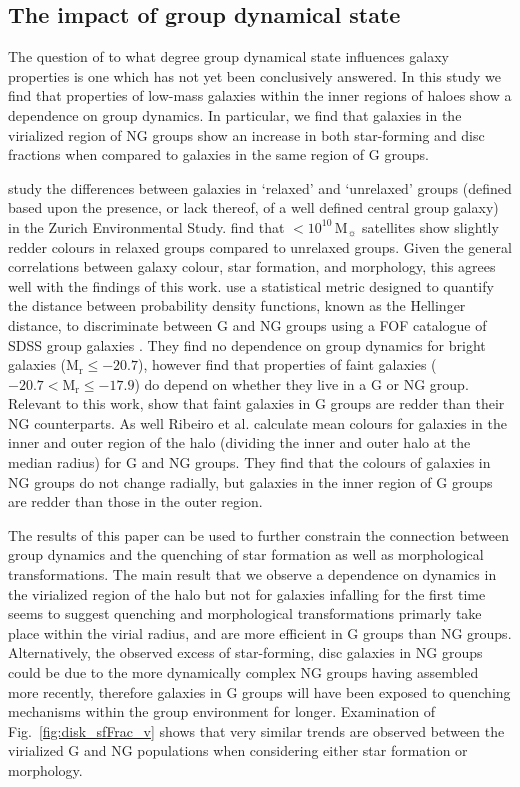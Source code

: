 \documentclass[a4paper,fleqn,usenatbib]{mnras}
\newcommand{\Msun}{\,\mathrm{M_{\sun}}}
\begin{document}
\subsection{The impact of group dynamical state}

The question of to what degree group dynamical state influences galaxy
properties is one which has not yet been conclusively answered.  In
this study we find that properties of low-mass galaxies within the inner
regions of haloes show a dependence on group dynamics.  In
particular, we find that galaxies in the virialized region of NG
groups show an increase in both star-forming and disc fractions
when compared to galaxies in the same region of G groups.
\par
\citet{carollo2013} study the differences between galaxies in
`relaxed' and `unrelaxed' groups (defined based upon the presence, or
lack thereof, of a well defined central group galaxy) in the Zurich
Environmental Study.  \citet{carollo2013} find that $<10^{10}\Msun$
satellites show slightly redder colours in relaxed groups compared to
unrelaxed groups.  Given the general correlations between galaxy colour, star
formation, and morphology, this agrees well with the findings of this
work. \citet{ribeiro2013} use a statistical metric designed to quantify the
distance between probability density functions, known as the Hellinger
distance, to discriminate between G and NG groups using a
FOF catalogue of SDSS group galaxies
\citep{berlind2006}.  They find no dependence on group dynamics for
bright galaxies ($\mathrm{M_r} \le -20.7$), however find that
properties of faint galaxies ($-20.7 < \mathrm{M_r} \le -17.9$) do
depend on whether they live in a G or NG group.  Relevant to this
work, \citet{ribeiro2013} show that faint galaxies in G groups are
redder than their NG counterparts. As well Ribeiro et al. calculate
mean colours for galaxies in the inner and outer region of the halo
(dividing the inner and outer halo at the median radius) for G and NG
groups.  They find that the colours of galaxies in NG groups do not
change radially, but galaxies in the inner region of G groups are
redder than those in the outer region.
\par
The results of this paper can be used to further constrain the
connection between group dynamics and the quenching of star formation as well
as morphological transformations.  The main result that we observe a
dependence on dynamics in the virialized region of the halo but not
for galaxies infalling for the first time seems to suggest quenching and
morphological transformations primarly take
place within the virial radius, and are more efficient in G
groups than NG groups.  Alternatively, the observed excess of
star-forming, disc galaxies in NG groups could be due to the more
dynamically complex NG groups having assembled more recently,
therefore galaxies in G groups will have been exposed to quenching
mechanisms within the group environment for longer.  Examination of
Fig.~\ref{fig:disk_sfFrac_v} shows that very similar trends are observed
between the virialized G and NG populations when considering either
star formation or morphology.
\end{document}
